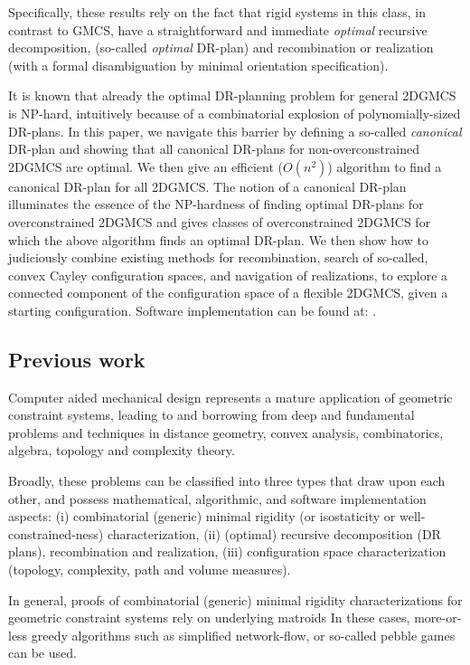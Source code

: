Specifically, these results  rely on the fact that rigid systems in this  class, in contrast to GMCS, 
have a straightforward and immediate {\sl optimal} recursive decomposition, (so-called {\sl optimal} DR-plan) and  recombination 
or realization (with a formal disambiguation by minimal orientation specification).

It is known  that already the optimal DR-planning problem for general 2DGMCS is NP-hard, intuitively 
because of a combinatorial explosion of polynomially-sized DR-plans.  In this paper, we  navigate this barrier by defining a 
so-called {\it canonical} DR-plan and showing that all canonical DR-plans for non-overconstrained 2DGMCS are optimal. 
We then give an efficient ($O(n^2)$) algorithm to find a canonical DR-plan for all 2DGMCS. The notion of a canonical DR-plan 
illuminates the essence of the NP-hardness of finding optimal DR-plans for overconstrained 2DGMCS and gives classes of 
overconstrained 2DGMCS for which the above  algorithm finds an optimal DR-plan. We then show how to judiciously combine 
existing methods for recombination, search of so-called, convex Cayley configuration spaces, and navigation of realizations, 
to explore a connected component of the configuration space of a flexible 2DGMCS, given a starting configuration. 
Software implementation can be found at: .


\subsection{Previous work}

Computer aided mechanical design represents a mature application of geometric constraint systems,  leading to and borrowing 
from deep and fundamental problems and techniques in distance geometry, convex analysis, combinatorics, algebra, topology 
and complexity theory.

Broadly, these problems can be classified into three types that draw upon each other, and possess mathematical, algorithmic, 
and software implementation aspects: (i) combinatorial (generic) minimal rigidity (or isostaticity or well-constrained-ness) 
characterization, (ii) (optimal) recursive decomposition (DR plans), recombination and realization, (iii) configuration space 
characterization (topology, complexity, path and volume measures).

In general, proofs of combinatorial (generic) minimal rigidity characterizations for geometric constraint systems rely on 
underlying matroids  In these cases, more-or-less greedy algorithms such as simplified network-flow, 
or so-called pebble games can be used.

